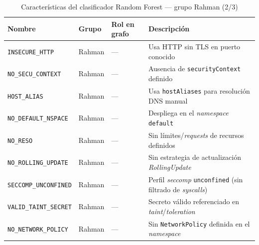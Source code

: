 \begin{table}[htbp]
\centering\small
\caption{Características del clasificador Random Forest — grupo Rahman (2/3)}
\label{tab:features_a2}
\begin{tabularx}{\textwidth}{@{}Lll>{\hsize}L@{}}
\toprule
Nombre & Grupo & Rol en grafo & Descripción \\
\midrule
\texttt{INSECURE\_HTTP} & Rahman & — & Usa HTTP sin TLS en puerto conocido \\
\texttt{NO\_SECU\_CONTEXT} & Rahman & — & Ausencia de \texttt{securityContext} definido \\
\texttt{HOST\_ALIAS} & Rahman & — & Usa \texttt{hostAliases} para resolución DNS manual \\
\texttt{NO\_DEFAULT\_NSPACE} & Rahman & — & Despliega en el \textit{namespace} \texttt{default} \\
\texttt{NO\_RESO} & Rahman & — & Sin límites/\textit{requests} de recursos definidos \\
\texttt{NO\_ROLLING\_UPDATE} & Rahman & — & Sin estrategia de actualización \textit{RollingUpdate} \\
\texttt{SECCOMP\_UNCONFINED} & Rahman & — & Perfil \textit{seccomp} \texttt{unconfined} (sin filtrado de \textit{syscalls}) \\
\texttt{VALID\_TAINT\_SECRET} & Rahman & — & Secreto válido referenciado en \textit{taint}/\textit{toleration} \\
\texttt{NO\_NETWORK\_POLICY} & Rahman & — & Sin \texttt{NetworkPolicy} definida en el \textit{namespace} \\
\bottomrule
\end{tabularx}
\fuentepropia
\end{table}

